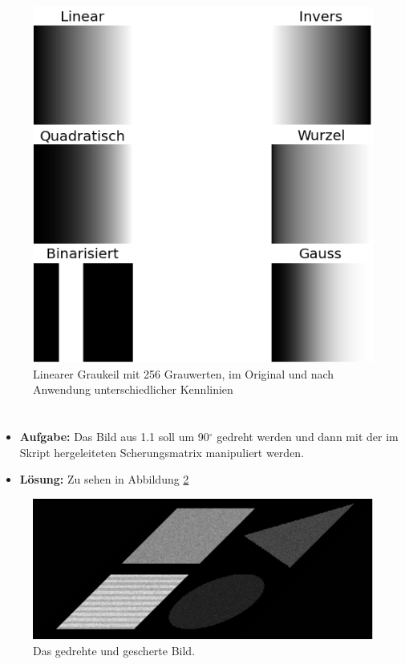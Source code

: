 \documentclass[12pt, a4paper, twoside]{report}
\begin{document}
\begin{figure}
\centering
\includegraphics[width=\textwidth]{../bilder/graukeil.png}
\caption{Linearer Graukeil mit 256 Grauwerten, im Original und nach Anwendung unterschiedlicher Kennlinien}
\label{gray}
\end{figure}

\section{}
\begin{itemize}
\item \textbf{Aufgabe:} Das Bild aus 1.1 soll um 90$^\circ$ gedreht werden und dann mit der im Skript hergeleiteten Scherungsmatrix manipuliert werden.
\item \textbf{Lösung:} Zu sehen in Abbildung \ref{scherung}
\end{itemize}

\begin{figure}
\centering
\includegraphics[width=\textwidth]{../bilder/scherung.png}
\caption{Das gedrehte und gescherte Bild.}
\label{scherung}
\end{figure}
\end{document}
